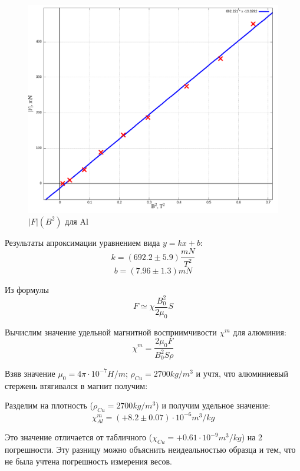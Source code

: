 \documentclass{article}
\begin{document}
    \begin{figure}[H]
        \centering
        \includegraphics[width=\textwidth]{Al-comp.png}
        \caption{$|F|(B^2)$ для Al}
    \end{figure}

    Результаты апроксимации уравнением вида \(y = kx + b\):
    \[ k = (692.2 \pm 5.9) \frac{mN}{T^2} \]
    \[ b = (7.96 \pm 1.3) mN \]

    Из формулы
    \[ F \simeq \chi\frac{B_0^2}{2\mu_0}S \]

    Вычислим значение удельной магнитной восприимчивости \(\chi^m\) для алюминия:
    \[ \chi^m = \frac{2\mu_0F}{B_0^2S\rho} \]

    Взяв значение \( \mu_0 = 4\pi \cdot 10^{-7} H/m \); \( \rho_{Cu} = 2700 kg/m^3 \) и учтя, что алюминиевый стержень
    втягивался в магнит получим:

    Разделим на плотность (\( \rho_{Cu} = 2700 kg/m^3 \)) и получим удельное значение:
    \[ \chi^{m}_{Al} = (+8.2 \pm 0.07) \cdot 10^{-6} m^3/kg \]

    Это значение отличается от табличного (\( \chi_{Cu} = +0.61 \cdot 10^{-9}m^3/kg  \)) на 2 погрешности. Эту разницу можно объяснить
    неидеальностью образца и тем, что не была учтена погрешность измерения весов.
\end{document}
